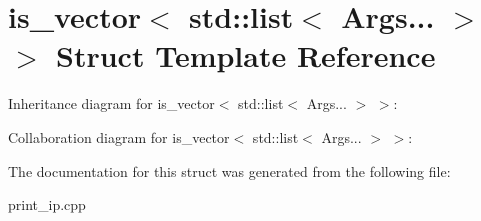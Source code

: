 \hypertarget{structis__vector_3_01std_1_1list_3_01_args_8_8_8_01_4_01_4}{}\section{is\+\_\+vector$<$ std\+:\+:list$<$ Args... $>$ $>$ Struct Template Reference}
\label{structis__vector_3_01std_1_1list_3_01_args_8_8_8_01_4_01_4}


Inheritance diagram for is\+\_\+vector$<$ std\+:\+:list$<$ Args... $>$ $>$\+:


Collaboration diagram for is\+\_\+vector$<$ std\+:\+:list$<$ Args... $>$ $>$\+:


The documentation for this struct was generated from the following file\+:\begin{DoxyCompactItemize}
\item 
print\+\_\+ip.\+cpp\end{DoxyCompactItemize}
